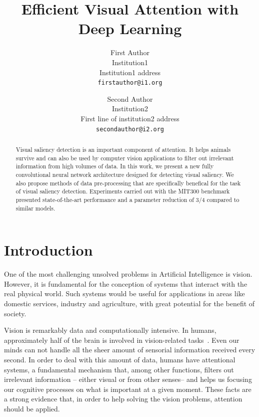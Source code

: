 \documentclass[10pt,twocolumn,letterpaper]{article}
\begin{document}
\title{Efficient Visual Attention with Deep Learning}

\author{First Author\\
Institution1\\
Institution1 address\\
{\tt\small firstauthor@i1.org}
\and
Second Author\\
Institution2\\
First line of institution2 address\\
{\tt\small secondauthor@i2.org}
}

\maketitle

\begin{abstract}
Visual saliency detection is an important component of attention.
It helps animals survive and can also be used by computer vision applications
to filter out irrelevant information from high volumes of data.
In this work, we present a new fully convolutional neural network
architecture designed for detecting visual saliency.
We also propose methods of data pre-processing that are specifically
benefical for the task of visual saliency detection.
Experiments carried out with the MIT300 benchmark presented state-of-the-art
performance and a parameter reduction of 3/4 compared to similar models.
\end{abstract}

\section{Introduction}
One of the most challenging unsolved problems in Artificial Intelligence
is vision.
However, it is fundamental for the conception of systems that interact
with the real physical world.
Such systems would be useful for applications in areas like
domestic services, industry and agriculture,
with great potential for the benefit of society.

Vision is remarkably data and computationally intensive.
In humans, approximately half of the brain is involved in
vision-related tasks~\cite{fixott_1957}.
Even our minds can not handle all the sheer amount of sensorial information
received every second. In order to deal with this amount of data,
humans have attentional systems, a fundamental mechanism
that, among other functions, filters out irrelevant information
-- either visual or from other senses-- and helps us focusing our cognitive
processes on what is important at a given moment.
These facts are a strong evidence that, in order to help solving the
vision problems, attention should be applied.
\end{document}
